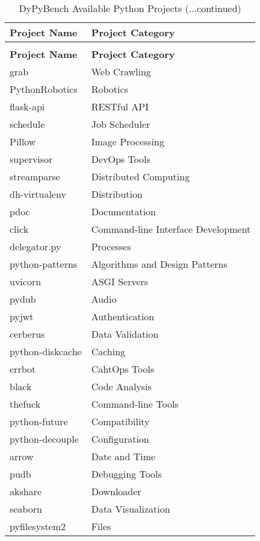 \centering
\begin{longtable} {|l|l|}
    \caption[DyPyBench Available Python Projects]{DyPyBench Available Python Projects \label{table:50_installed_projects}}\\
    \hline
    \textbf{Project Name} & \textbf{Project Category}\\
    \hline
    \endfirsthead
    \caption[]{DyPyBench Available Python Projects (...continued)}\\
    \hline
    \textbf{Project Name} & \textbf{Project Category}\\
    \hline
    \endhead
    \hline
    \endfoot
    grab & Web Crawling\\
    PythonRobotics & Robotics\\
    flask-api & RESTful API\\
    schedule & Job Scheduler\\
    Pillow & Image Processing\\
    supervisor & DevOps Tools\\
    streamparse & Distributed Computing\\
    dh-virtualenv & Distribution\\
    pdoc & Documentation\\
    click & Command-line Interface Development\\
    delegator.py & Processes\\
    python-patterns & Algorithms and Design Patterns\\
    uvicorn & ASGI Servers\\
    pydub & Audio\\
    pyjwt & Authentication\\
    cerberus & Data Validation\\
    python-diskcache & Caching\\
    errbot & CahtOps Tools\\
    black & Code Analysis\\
    thefuck & Command-line Tools\\
    python-future & Compatibility\\
    python-decouple & Configuration\\
    arrow & Date and Time\\
    pudb & Debugging Tools\\
    akshare & Downloader\\
    seaborn & Data Visualization\\
    pyfilesystem2 & Files\\

\end{longtable}
